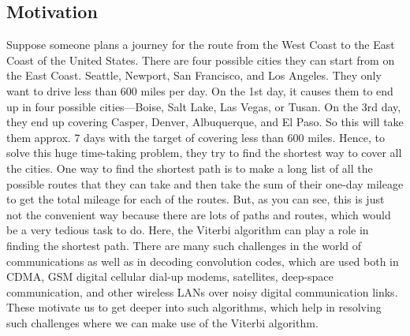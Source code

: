 \documentclass[12pt,journal,compsoc]{IEEEtran}
\begin{document}
\subsection{Motivation}
Suppose someone plans a journey for the route from the West Coast to the East Coast of the United States. There are four possible cities they can start from on the East Coast. Seattle, Newport, San Francisco, and Los Angeles. They only want to drive less than 600 miles per day. On the 1st day, it causes them to end up in four possible cities—Boise, Salt Lake, Las Vegas, or Tusan. On the 3rd day, they end up covering Casper, Denver, Albuquerque, and El Paso. So this will take them approx. 7 days with the target of covering less than 600 miles. Hence, to solve this huge time-taking problem, they try to find the shortest way to cover all the cities. One way to find the shortest path is to make a long list of all the possible routes that they can take and then take the sum of their one-day mileage to get the total mileage for each of the routes. But, as you can see, this is just not the convenient way because there are lots of paths and routes, which would be a very tedious task to do. Here, the Viterbi algorithm can play a role in finding the shortest path. There are many such challenges in the world of communications as well as in decoding convolution codes, which are used both in CDMA, GSM digital cellular dial-up modems, satellites, deep-space communication, and other wireless LANs over noisy digital communication links. These motivate us to get deeper into such algorithms, which help in resolving such challenges where we can make use of the Viterbi algorithm. \cite{lecture:viterbi}

%
%
\end{document}
